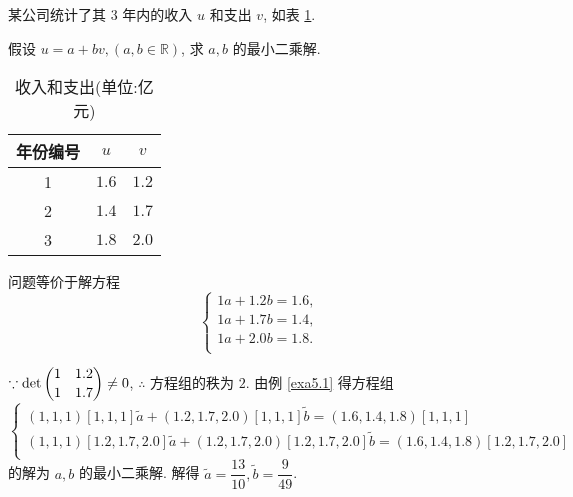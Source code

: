\documentclass[color=black,device=normal,lang=cn,mode=geye]{elegantnote}
\begin{document}
\begin{exercisec}%
    某公司统计了其 3 年内的收入 $u$ 和支出 $v$, 如表 \ref{tb1}.
    
    假设 $u=a+bv,(a,b\in\mathbb{R})$, 求 $a,b$ 的最小二乘解.
\end{exercisec}
\begin{table}[htbp!]
    \centering
    \begin{tabular}{c|cc}
        年份编号 & $u$ & $v$ \\
        \hline
        1 & $1.6$ & $1.2$ \\
        2 & $1.4$ & $1.7$ \\
        3 & $1.8$ & $2.0$ \\
    \end{tabular}
    \caption{收入和支出(单位:亿元)}\label{tb1}
\end{table}
\begin{solution}
    问题等价于解方程
    \[\begin{cases}
        1a+1.2b=1.6, \\
        1a+1.7b=1.4, \\
        1a+2.0b=1.8. \\
    \end{cases}\]

    $\because\det\dbinom{1\quad1.2}{1\quad1.7}\neq0$, $\therefore$ 方程组的秩为 $2$. 由例 \ref{exa5.1} 得方程组
    \[\begin{cases}
        (1,1,1)[1,1,1]\tilde{a}+(1.2,1.7,2.0)[1,1,1]\tilde{b}=(1.6,1.4,1.8)[1,1,1] \\
        (1,1,1)[1.2,1.7,2.0]\tilde{a}+(1.2,1.7,2.0)[1.2,1.7,2.0]\tilde{b}=(1.6,1.4,1.8)[1.2,1.7,2.0] \\
    \end{cases}\]
    的解为 $a,b$ 的最小二乘解. 解得 $\tilde{a}=\dfrac{13}{10},\tilde{b}=\dfrac{9}{49}$.
\end{solution}
\end{document}
